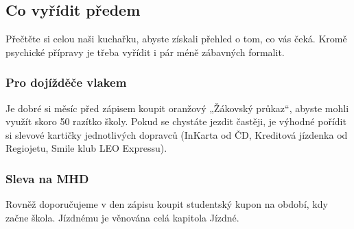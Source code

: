 \subsection{Co vyřídit předem}
Přečtěte si celou naši kuchařku, abyste získali přehled o tom, co vás čeká.
Kromě psychické přípravy je třeba vyřídit i pár méně zábavných formalit.

\subsubsection{Pro dojížděče vlakem}
Je dobré si měsíc před zápisem koupit oranžový „Žákovský průkaz“, abyste mohli
využít skoro 50%
razítko školy. Pokud se chystáte jezdit častěji, je výhodné pořídit si slevové
kartičky jednotlivých dopravců (InKarta od ČD, Kreditová jízdenka od
Regiojetu, Smile klub LEO Expressu).

\subsubsection{Sleva na MHD}
Rovněž doporučujeme v den zápisu koupit studentský kupon na období,
kdy začne škola. Jízdnému je věnována celá kapitola Jízdné. 